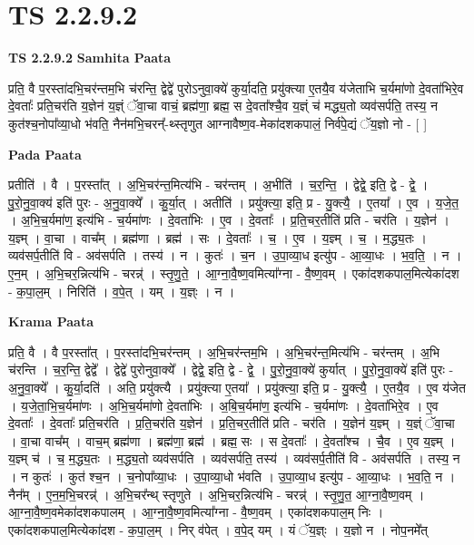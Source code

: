 \documentclass[17pt]{extarticle}
\begin{document}
\section*{ TS 2.2.9.2 }

\textbf{TS 2.2.9.2 } \newline
\textbf{Samhita Paata} \newline

प्रति॒ वै प॒रस्ता॑दभि॒चर॑न्तम॒भि च॑रन्ति॒ द्वेद्वे॑ पुरोऽनुवा॒क्ये॑ कुर्या॒दति॒ प्रयु॑क्त्या ए॒तयै॒व य॑जेताभि च॒र्यमा॑णो दे॒वता॑भिरे॒व दे॒वताः᳚ प्रति॒चर॑ति य॒ज्ञेन॑ य॒ज्ञ्ं ॅवा॒चा वाचं॒ ब्रह्म॑णा॒ ब्रह्म॒ स दे॒वता᳚श्चै॒व य॒ज्ञ्ं च॑ मद्ध्य॒तो व्यव॑सर्पति॒ तस्य॒ न कुत॑श्च॒नोपा᳚व्या॒धो भ॑वति॒ नैन॑मभि॒चरन्᳚-थ्स्तृणुत आग्नावैष्ण॒व-मेका॑दशकपालं॒ निर्व॑पे॒द्यं ॅय॒ज्ञो नो - [  ] \newline

\textbf{Pada Paata} \newline

प्रतीति॑ । वै । प॒रस्ता᳚त् । अ॒भि॒चर॑न्त॒मित्य॑भि - चर॑न्तम् । अ॒भीति॑ । च॒र॒न्ति॒ । द्वेद्वे॒ इति॒ द्वे - द्वे॒ । पु॒रो॒नु॒वा॒क्य॑ इति॑ पुरः - अ॒नु॒वा॒क्ये᳚ । कु॒र्या॒त् । अतीति॑ । प्रयु॑क्त्या॒ इति॒ प्र - यु॒क्त्यै॒ । ए॒तया᳚ । ए॒व । य॒जे॒त॒ । अ॒भि॒च॒र्यमा॑ण॒ इत्य॑भि - च॒र्यमा॑णः । दे॒वता॑भिः । ए॒व । दे॒वताः᳚ । प्र॒ति॒चर॒तीति॑ प्रति - चर॑ति । य॒ज्ञेन॑ । य॒ज्ञ्म् । वा॒चा । वाच᳚म् । ब्रह्म॑णा । ब्रह्म॑ । सः । दे॒वताः᳚ । च॒ । ए॒व । य॒ज्ञ्म् । च॒ । म॒द्ध्य॒तः । व्यव॑सर्प॒तीति॑ वि - अव॑सर्पति । तस्य॑ । न । कुतः॑ । च॒न । उ॒पा॒व्या॒ध इत्यु॑प - आ॒व्या॒धः । भ॒व॒ति॒ । न । ए॒न॒म् । अ॒भि॒चर॒न्नित्य॑भि - चरन्न्॑ । स्तृ॒णु॒ते॒ । आ॒ग्ना॒वै॒ष्ण॒वमित्या᳚ग्ना - वै॒ष्ण॒वम् । एका॑दशकपाल॒मित्येका॑दश - क॒पा॒ल॒म् । निरिति॑ । व॒पे॒त् । यम् । य॒ज्ञ्ः । न ।  \newline


\textbf{Krama Paata} \newline

प्रति॒ वै । वै प॒रस्ता᳚त् । प॒रस्ता॑दभि॒चर॑न्तम् । अ॒भि॒चर॑न्तम॒भि । अ॒भि॒चर॑न्त॒मित्य॑भि - चर॑न्तम् । अ॒भि च॑रन्ति । च॒र॒न्ति॒ द्वेद्वे᳚ । द्वेद्वे॑ पुरोनुवा॒क्ये᳚ । द्वेद्वे॒ इति॒ द्वे - द्वे॒ । पु॒रो॒नु॒वा॒क्ये॑ कुर्यात् । पु॒रो॒नु॒वा॒क्ये॑ इति॑ पुरः - अ॒नु॒वा॒क्ये᳚ । कु॒र्या॒दति॑ । अति॒ प्रयु॑क्त्यै । प्रयु॑क्त्या ए॒तया᳚ । प्रयु॑क्त्या॒ इति॒ प्र - यु॒क्त्यै॒ । ए॒तयै॒व । ए॒व य॑जेत । य॒जे॒ता॒भि॒च॒र्यमा॑णः । अ॒भि॒च॒र्यमा॑णो दे॒वता॑भिः । अ॒बि॒च॒र्यमा॑ण॒ इत्य॑भि - च॒र्यमा॑णः । दे॒वता॑भिरे॒व । ए॒व दे॒वताः᳚ । दे॒वताः᳚ प्रति॒चर॑ति । प्र॒ति॒चर॑ति य॒ज्ञेन॑ । प्र॒ति॒चर॒तीति॑ प्रति - चर॑ति । य॒ज्ञेन॑ य॒ज्ञ्म् । य॒ज्ञ्ं ॅवा॒चा । वा॒चा वाच᳚म् । वाच॒म् ब्रह्म॑णा । ब्रह्म॑णा॒ ब्रह्म॑ । ब्रह्म॒ सः । स दे॒वताः᳚ । दे॒वता᳚श्च । चै॒व । ए॒व य॒ज्ञ्म् । य॒ज्ञ्म् च॑ । च॒ म॒द्ध्य॒तः । म॒द्ध्य॒तो व्यव॑सर्पति । व्यव॑सर्पति॒ तस्य॑ । व्यव॑सर्प॒तीति॑ वि - अव॑सर्पति । तस्य॒ न । न कुतः॑ । कुत॑ श्च॒न । च॒नोपा᳚व्या॒धः । उ॒पा॒व्या॒धो भ॑वति । उ॒पा॒व्या॒ध इत्यु॑प - आ॒व्या॒धः । भ॒व॒ति॒ न । नैन᳚म् । ए॒न॒म॒भि॒चरन्न्॑ । अ॒भि॒चर᳚न्थ् स्तृणुते । अ॒भि॒चर॒न्नित्य॑भि - चरन्न्॑ । स्तृ॒णु॒त॒ आ॒ग्ना॒वै॒ष्ण॒वम् । आ॒ग्ना॒वै॒ष्ण॒वमेका॑दशकपालम् । आ॒ग्ना॒वै॒ष्ण॒वमित्या᳚ग्ना - वै॒ष्ण॒वम् । एका॑दशकपाल॒म् निः । एका॑दशकपाल॒मित्येका॑दश - क॒पा॒ल॒म् । निर् व॑पेत् । व॒पे॒द् यम् । यं ॅय॒ज्ञ्ः । य॒ज्ञो न । 
नोप॒नमे᳚त् \newline
\end{document}
